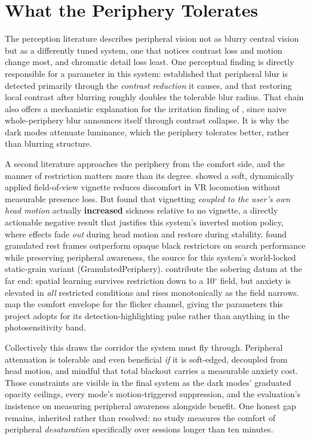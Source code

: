 \section{What the Periphery Tolerates}

The perception literature describes peripheral vision not as blurry central vision but as a
differently tuned system, one that notices contrast loss and motion change most, and chromatic
detail loss least. One perceptual finding is
directly responsible for a parameter in this system: \citet{patney2016} established that peripheral
blur is detected primarily through the \textit{contrast reduction} it causes, and that restoring
local contrast after blurring roughly doubles the tolerable blur radius. That chain also offers a
mechanistic explanation for the irritation finding of \citet{grogorick2018}, since naive
whole-periphery blur announces itself through contrast collapse. It is why the dark modes attenuate
luminance, which the periphery tolerates better, rather than blurring structure.

A second literature approaches the periphery from the comfort side, and the manner of restriction
matters more than its degree. \citet{fernandes2016} showed a soft, dynamically applied field-of-view
vignette reduces discomfort in VR locomotion without measurable presence loss. But
\citet{norouzi2018} found that vignetting \textit{coupled to the user's own head motion} actually
\textbf{increased} sickness relative to no vignette, a directly actionable negative result that
justifies this system's inverted motion policy, where effects fade \textit{out} during head motion
and restore during stability. \citet{cao2021} found granulated rest frames outperform opaque black
restrictors on search performance while preserving peripheral awareness, the source for this
system's world-locked static-grain variant (GranulatedPeriphery). \citet{barhorstcates2016} contribute the sobering datum at the far end:
spatial learning survives restriction down to a 10$^{\circ}$ field, but anxiety is elevated in
\textit{all} restricted conditions and rises monotonically as the field narrows. \citet{waldner2014}
map the comfort envelope for the flicker channel, giving the parameters this project adopts for its
detection-highlighting pulse rather than anything in the photosensitivity band.

Collectively this draws the corridor the system must fly through. Peripheral attenuation is tolerable
and even beneficial \textit{if} it is soft-edged, decoupled from head motion, and mindful that total
blackout carries a measurable anxiety cost. Those constraints are visible in the final system as the
dark modes' graduated opacity ceilings, every mode's motion-triggered suppression, and the
evaluation's insistence on measuring peripheral awareness alongside benefit. One honest gap remains,
inherited rather than resolved: no study measures the comfort of peripheral \textit{desaturation}
specifically over sessions longer than ten minutes.

